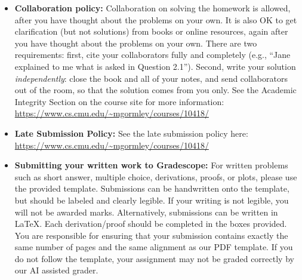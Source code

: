 \documentclass[11pt,addpoints,answers]{exam}
\numberwithin{equation}{section} %
\numberwithin{figure}{section} %
\numberwithin{table}{section} %
\begin{document}
\begin{itemize}
\item \textbf{Collaboration policy:} Collaboration on solving the homework is allowed, after you have thought about the problems on your own. It is also OK to get clarification (but not solutions) from books or online resources, again after you have thought about the problems on your own. There are two requirements: first, cite your collaborators fully and completely (e.g., ``Jane explained to me what is asked in Question 2.1''). Second, write your solution {\em independently}: close the book and all of your notes, and send collaborators out of the room, so that the solution comes from you only.  See the Academic Integrity Section on the course site for more information: \url{https://www.cs.cmu.edu/~mgormley/courses/10418/}

\item\textbf{Late Submission Policy:} See the late submission policy here: \url{https://www.cs.cmu.edu/~mgormley/courses/10418/}





\item \textbf{Submitting your written work to Gradescope:} For written problems such as short answer, multiple choice, derivations, proofs, or plots, please use the provided template. Submissions can be handwritten onto the template, but should be labeled and clearly legible. If your writing is not legible, you will not be awarded marks. Alternatively, submissions can be written in LaTeX. Each derivation/proof should be completed in the boxes provided. You are responsible for ensuring that your submission contains exactly the same number of pages and the same alignment as our PDF template. If you do not follow the template, your assignment may not be graded correctly by our AI assisted grader.


\end{itemize}
\end{document}
